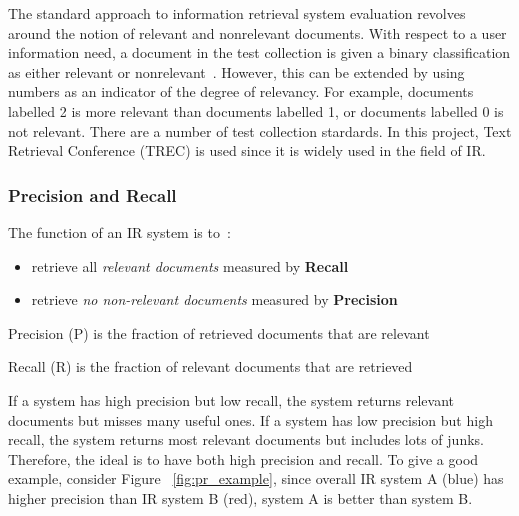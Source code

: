 The standard approach to information retrieval system evaluation revolves around the notion of relevant and nonrelevant documents. With respect 
to a user information need, a document in the test collection is given a binary classification as either relevant or nonrelevant~\cite{evalweb}. However,
this can be extended by using numbers as an indicator of the degree of relevancy. For example, documents labelled 2 is more relevant than documents
labelled 1, or documents labelled 0 is not relevant. There are a number of test collection stardards. In this project, Text Retrieval Conference (TREC)
is used since it is widely used in the field of IR.

\subsubsection{Precision and Recall}
The function of an IR system is to~\cite[P. 10]{eval}:
\begin{itemize}
 \item retrieve all \textit{relevant documents} measured by \textbf{Recall}
 \item retrieve \textit{no non-relevant documents} measured by \textbf{Precision}
\end{itemize}

Precision (P) is the fraction of retrieved documents that are relevant 
\begin{center}
\end{center}

Recall (R) is the fraction of relevant documents that are retrieved 
\begin{center}
\end{center}

If a system has high precision but low recall, the system returns relevant documents but misses many useful ones.
If a system has low precision but high recall, the system returns most relevant documents but includes lots of junks.
Therefore, the ideal is to have both high precision and recall. To give a good example, consider Figure ~\ref{fig:pr_example}, since
overall IR system A (blue) has higher precision than IR system B (red), system A is better than system B.

